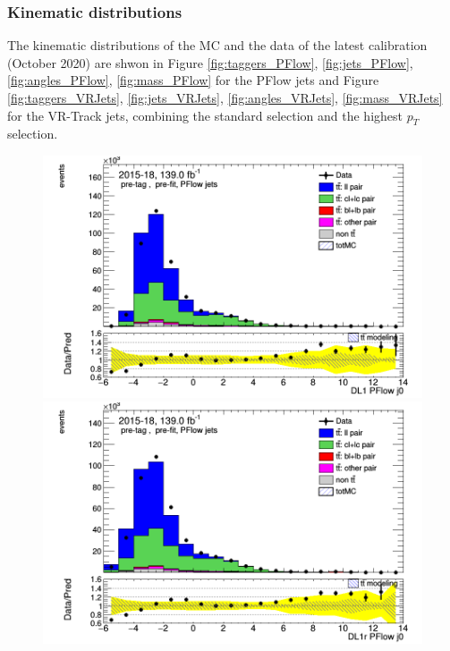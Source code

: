 \documentclass[letterpaper,12pt]{article}
\begin{document}
\subsubsection{Kinematic distributions}
The kinematic distributions of the MC and the data of the latest calibration (October 2020) are shwon in Figure \ref{fig:taggers_PFlow}, \ref{fig:jets_PFlow}, \ref{fig:angles_PFlow}, \ref{fig:mass_PFlow} for the PFlow jets and Figure \ref{fig:taggers_VRJets}, \ref{fig:jets_VRJets}, \ref{fig:angles_VRJets}, \ref{fig:mass_VRJets} for the VR-Track jets, combining the standard selection and the highest $p_T$ selection. 

\begin{figure}[H]
\begin{minipage}[b]{.45\textwidth}
\centering
\includegraphics[width=1\textwidth]{Oct_distributions/pretagNoRwDL1rwithhighpTPFlow_scaledall/DataMC__J0_DL1.png}
\end{minipage}\hfill
\begin{minipage}[b]{.45\textwidth}
\centering
\includegraphics[width=1\textwidth]{Oct_distributions/pretagNoRwDL1rwithhighpTPFlow_scaledall/DataMC__J0_DL1r.png}

\end{minipage}
\end{figure}
\end{document}
